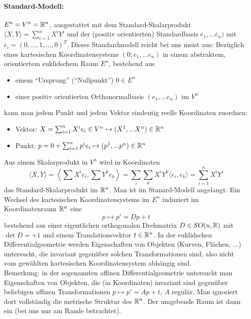   \paragraph*{Standard-Modell:} \(E^n = V^n = \mathbb{R}^n\), ausgestattet mit dem Standard-Skalarprodukt \(\langle X, Y \rangle = \sum_{i=1}^n X^iY^i\) und der (positiv orientierten) Standardbasis \(\mathring{e_1}, ... \mathring{e_n})\) mit \(\mathring{e_i} = (0, \dots, 1, \dots, 0)^T\).
  Dieses Standardmodell reicht bei uns meist aus:
  Bezüglich eines kartesischen Koordinatensystems \((0; e_1, ... e_n)\) in einem abstraktem, orientiertem euklidschem Raum \(E^n\), bestehend aus 
  \begin{itemize}
   \item einem "`Ursprung"' ("`Nullpunkt"') \(0 \in E^n\)
   \item einer positiv orientierten Orthonormalbasis \((e_1, ... e_n)\) im \(V^n\)
  \end{itemize}
  kann man jedem Punkt und jedem Vektor eindeutig reelle Koordinaten zuordnen:
  \begin{itemize}
   \item Vektor: \(X = \sum_{i=1}^n X^ie_i \in V^n \mapsto (X^1, ... X^n) \in \mathbb{R}^n\)
   \item Punkt: \(p = 0 + \sum_{i=1}^n p^ie_i \mapsto (p^1, ... p^n) \in \mathbb{R}^n\)
  \end{itemize}
  Aus einem Skalarprodukt in \(V^n\) wird in Koordinaten
  \[
   \langle X, Y \rangle = \left\langle \sum X^ie_i, \sum Y^ke_k \right\rangle = \sum_{i}\sum_{k} X^iY^k \langle e_i, e_k \rangle = \sum_{i=1}^n X^iY^i
  \]
  das Standard-Skalarprodukt im \(\mathbb{R}^n\).
  Man ist im Stanard-Modell angelangt.
  Ein Wechsel des kartesischen Koordinatensystems im \(E^n\) induziert im Koordinatenraum \(\mathbb{R}^n\) eine  \[p \mapsto p' = Dp + t\] bestehend aus einer eigentlichen orthogonalen Drehmatrix \(D \in SO(u, \mathbb{R})\) mit \(\det D = +1\) und einem Translationsvektor \(t \in \mathbb{R}^n\).
  In der euklidschen Differentialgeometrie werden Eigenschaften von Objekten (Kurven, Flächen, ...) untersucht, die invariant gegenüber solchen Transformationen sind, also nicht vom gewählten kartesischen Koordinatensystem abhängig sind. \\
  Bemerkung: in der sogenannten affinen Differentialgeometrie untersucht man Eigenschaften von Objekten, die (in Koordinaten) invariant sind gegenüber beliebigen affinen Transformationen \(p \mapsto p' = Ap + t\), \(A\) regulär. Man ignoriert dort vollständig die metrische Struktur des \(\mathbb{R}^n\).
  Der umgebende Raum ist dann ein  (bei uns nur am Rande betrachtet).
  
